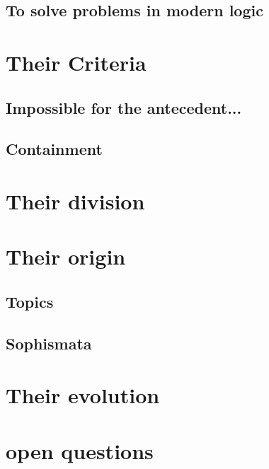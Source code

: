 \documentclass[]{article}
\begin{document}
\subsection{To solve problems in modern logic}

\section{Their Criteria}
\subsection{Impossible for the antecedent...}
\subsection{Containment}
\section{Their division}
\section{Their origin}
\subsection{Topics}
\subsection{Sophismata}
\section{Their evolution}
\section{open questions}
\end{document}
